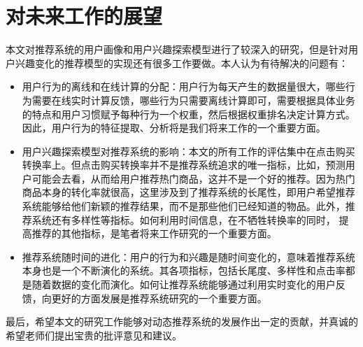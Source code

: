   \section{对未来工作的展望}
  本文对推荐系统的用户画像和用户兴趣探索模型进行了较深入的研究，但是针对用户兴趣变化的推荐模型的实现还有很多工作要做。本人认为有待解决的问题有：
    \begin{itemize}
      \item 用户行为的离线和在线计算的分配：用户行为每天产生的数据量很大，哪些行为需要在线实时计算反馈，哪些行为只需要离线计算即可，需要根据具体业务的特点和用户习惯赋予每种行为一个权重，然后根据权重排名决定计算方式。因此，用户行为的特征提取、分析将是我们将来工作的一个重要方面。
      \item 用户兴趣探索模型对推荐系统的影响：本文的所有工作的评估集中在点击购买转换率上。但点击购买转换率并不是推荐系统追求的唯一指标，比如，预测用户可能会去看，从而给用户推荐热门商品，这并不是一个好的推荐。因为热门商品本身的转化率就很高，这里涉及到了推荐系统的长尾性，即用户希望推荐系统能够给他们新颖的推荐结果，而不是那些他们已经知道的物品。此外，推荐系统还有多样性等指标。如何利用时间信息，在不牺牲转换率的同时， 提高推荐的其他指标，是笔者将来工作研究的一个重要方面。
      \item 推荐系统随时间的进化：用户的行为和兴趣是随时间变化的，意味着推荐系统本身也是一个不断演化的系统。其各项指标，包括长尾度、多样性和点击率都是随着数据的变化而演化。如何让推荐系统能够通过利用实时变化的用户反馈，向更好的方面发展是推荐系统研究的一个重要方面。
    \end{itemize}

  最后，希望本文的研究工作能够对动态推荐系统的发展作出一定的贡献，并真诚的希望老师们提出宝贵的批评意见和建议。